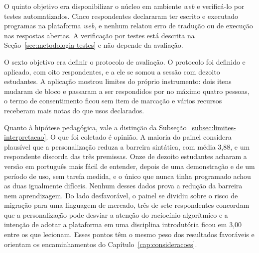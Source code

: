 O quinto objetivo era disponibilizar o núcleo em ambiente \textit{web} e verificá-lo por testes automatizados. Cinco respondentes declararam ter escrito e executado programas na plataforma \textit{web}, e nenhum relatou erro de tradução ou de execução nas respostas abertas. A verificação por testes está descrita na Seção~\ref{sec:metodologia-testes} e não depende da avaliação.

O sexto objetivo era definir o protocolo de avaliação. O protocolo foi definido e aplicado, com oito respondentes, e a ele se somou a sessão com dezoito estudantes. A aplicação mostrou limites do próprio instrumento: dois itens mudaram de bloco e passaram a ser respondidos por no máximo quatro pessoas, o termo de consentimento ficou sem item de marcação e vários recursos receberam mais notas do que usos declarados.

Quanto à hipótese pedagógica, vale a distinção da Subseção~\ref{subsec:limites-interpretacao}. O que foi coletado é opinião. A maioria do painel considera plausível que a personalização reduza a barreira sintática, com média 3,88, e um respondente discorda das três premissas. Onze de dezoito estudantes acharam a versão em português mais fácil de entender, depois de uma demonstração e de um período de uso, sem tarefa medida, e o único que nunca tinha programado achou as duas igualmente difíceis. Nenhum desses dados prova a redução da barreira nem aprendizagem. Do lado desfavorável, o painel se dividiu sobre o risco de migração para uma linguagem de mercado, três de sete respondentes concordam que a personalização pode desviar a atenção do raciocínio algorítmico e a intenção de adotar a plataforma em uma disciplina introdutória ficou em 3,00 entre os que lecionam. Esses pontos têm o mesmo peso dos resultados favoráveis e orientam os encaminhamentos do Capítulo~\ref{cap:consideracoes}.
